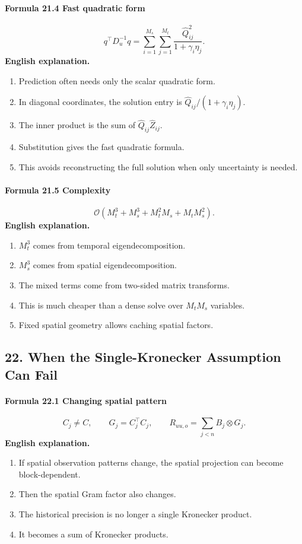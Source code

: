 \documentclass[12pt]{article}
\begin{document}
\paragraph{Formula 21.4 Fast quadratic form}
\[
q^\top D_u^{-1}q
=
\sum_{i=1}^{M_s}\sum_{j=1}^{M_t}
\frac{\widehat Q_{ij}^2}{1+\gamma_i\eta_j}.
\]
\textbf{English explanation.}
\begin{enumerate}[leftmargin=2em]
\item Prediction often needs only the scalar quadratic form.
\item In diagonal coordinates, the solution entry is \(\widehat Q_{ij}/(1+\gamma_i\eta_j)\).
\item The inner product is the sum of \(\widehat Q_{ij}\widehat Z_{ij}\).
\item Substitution gives the fast quadratic formula.
\item This avoids reconstructing the full solution when only uncertainty is needed.
\end{enumerate}

\paragraph{Formula 21.5 Complexity}
\[
\mathcal O(M_t^3+M_s^3+M_t^2M_s+M_tM_s^2).
\]
\textbf{English explanation.}
\begin{enumerate}[leftmargin=2em]
\item \(M_t^3\) comes from temporal eigendecomposition.
\item \(M_s^3\) comes from spatial eigendecomposition.
\item The mixed terms come from two-sided matrix transforms.
\item This is much cheaper than a dense solve over \(M_tM_s\) variables.
\item Fixed spatial geometry allows caching spatial factors.
\end{enumerate}

\subsection{22. When the Single-Kronecker Assumption Can Fail}
\paragraph{Formula 22.1 Changing spatial pattern}
\[
C_j\neq C,
\qquad
G_j=C_j^\top C_j,
\qquad
R_{uu,o}=\sum_{j<n}B_j\otimes G_j.
\]
\textbf{English explanation.}
\begin{enumerate}[leftmargin=2em]
\item If spatial observation patterns change, the spatial projection can become block-dependent.
\item Then the spatial Gram factor also changes.
\item The historical precision is no longer a single Kronecker product.
\item It becomes a sum of Kronecker products.
\end{enumerate}
\end{document}
